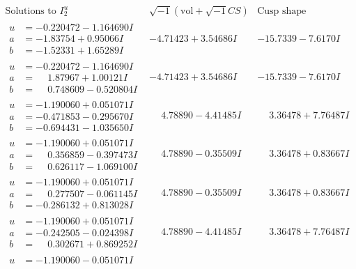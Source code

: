 \documentclass[1p]{elsarticle_modified}
\theoremstyle{definition}
\newcommand{\I}{\sqrt{-1}}
\begin{document}
$$\begin{array}{c|c|c}
\text{Solutions to }I^u_{2}& \I (\text{vol} + \sqrt{-1}CS) & \text{Cusp shape}\\
 \hline 
\begin{aligned}
u &= -0.220472 - 1.164690 I \\
a &= -1.83754 + 0.95066 I \\
b &= -1.52331 + 1.65289 I\end{aligned}
 & -4.71423 + 3.54686 I & -15.7339 - 7.6170 I \\ \hline\begin{aligned}
u &= -0.220472 - 1.164690 I \\
a &= \phantom{-}1.87967 + 1.00121 I \\
b &= \phantom{-}0.748609 - 0.520804 I\end{aligned}
 & -4.71423 + 3.54686 I & -15.7339 - 7.6170 I \\ \hline\begin{aligned}
u &= -1.190060 + 0.051071 I \\
a &= -0.471853 - 0.295670 I \\
b &= -0.694431 - 1.035650 I\end{aligned}
 & \phantom{-}4.78890 - 4.41485 I & \phantom{-}3.36478 + 7.76487 I \\ \hline\begin{aligned}
u &= -1.190060 + 0.051071 I \\
a &= \phantom{-}0.356859 - 0.397473 I \\
b &= \phantom{-}0.626117 - 1.069100 I\end{aligned}
 & \phantom{-}4.78890 - 0.35509 I & \phantom{-}3.36478 + 0.83667 I \\ \hline\begin{aligned}
u &= -1.190060 + 0.051071 I \\
a &= \phantom{-}0.277507 - 0.061145 I \\
b &= -0.286132 + 0.813028 I\end{aligned}
 & \phantom{-}4.78890 - 0.35509 I & \phantom{-}3.36478 + 0.83667 I \\ \hline\begin{aligned}
u &= -1.190060 + 0.051071 I \\
a &= -0.242505 - 0.024398 I \\
b &= \phantom{-}0.302671 + 0.869252 I\end{aligned}
 & \phantom{-}4.78890 - 4.41485 I & \phantom{-}3.36478 + 7.76487 I \\ \hline\begin{aligned}
u &= -1.190060 - 0.051071 I \\

\end{aligned}
\end{array}$$
\end{document}
